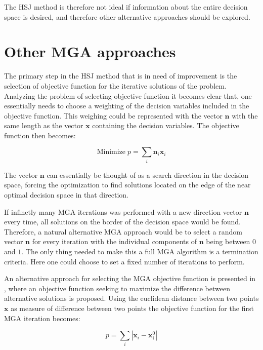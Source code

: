 The HSJ method is therefore not ideal if information about the entire decision space is desired, and therefore other alternative approaches should be explored. 

\section{Other MGA approaches}

The primary step in the HSJ method that is in need of improvement is the selection of objective function for the iterative solutions of the problem. Analyzing the problem of selecting objective function it becomes clear that, one essentially needs to choose a weighting of the decision variables included in the objective function. This weighing could be represented with the vector $\mathbf{n}$ with the same length as the vector $\mathbf{x}$ containing the decision variables. The objective function then becomes: 

\begin{equation}\label{eq:objective_func_weighted}
\text{Minimize} \; p = \sum_i \mathbf{n}_i\mathbf{x}_i
\end{equation}

The vector $\mathbf{n}$ can essentially be thought of as a search direction in the decision space, forcing the optimization to find solutions located on the edge of the near optimal decision space in that direction. 

If infinetly many MGA iterations was performed with a new direction vector $\mathbf{n}$ every time, all solutions on the border of the decision space would be found. Therefore, a natural alternative MGA approach would be to select a random vector $\mathbf{n}$ for every iteration with the individual components of $\mathbf{n}$ being between $0$ and $1$. 
The only thing needed to make this a full MGA algorithm is a termination criteria. Here one could choose to set a fixed number of iterations to perform. 

An alternative approach for selecting the MGA objective function is presented in \cite{Genetic_Algorithms_for_MGA}, where an objective function seeking to maximize the difference between alternative solutions is proposed. Using the euclidean distance between two points $\mathbf{x}$ as measure of difference between two points the objective function for the first MGA iteration becomes: 

\begin{equation}\label{eq:MGA_max_diff_1}
	p = \sum_i |\mathbf{x}_i - \mathbf{x}_i^0|
\end{equation}


